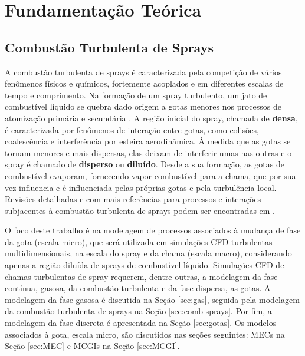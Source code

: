 

\section{Fundamentação Teórica}


\subsection{Combustão Turbulenta de Sprays} \label{sec:teoria}

A combustão turbulenta de sprays é caracterizada pela competição de vários fenômenos físicos e químicos, fortemente acoplados e em diferentes escalas de tempo e comprimento. 
Na formação de um spray turbulento, um jato de combustível líquido se quebra dado origem a gotas menores nos processos de atomização primária e secundária \cite{JennyB2012}.
A região inicial do spray, chamada de \textbf{densa}, é caracterizada por fenômenos de interação entre gotas, como colisões, coalescência e interferência por esteira aerodinâmica.
À medida que as gotas se tornam menores e mais dispersas, elas deixam de interferir umas nas outras e o spray é chamado de \textbf{disperso} ou \textbf{diluído}. 
Desde a sua formação, as gotas de combustível evaporam, fornecendo vapor combustível para a chama, que por sua vez influencia e é influenciada pelas próprias gotas e pela turbulência local.
Revisões detalhadas e com mais referências para processos e interações subjacentes à combustão turbulenta de sprays podem ser encontradas em \cite{JennyB2012, MasriA2016, SanchezA2015, ZhouL2021,JiangX2010}.

O foco deste trabalho é na modelagem de processos associados à mudança de fase da gota (escala micro), que será utilizada em simulações CFD turbulentas multidimensionais, na escala do spray e da chama (escala macro), considerando apenas a região diluída de sprays de combustível líquido.
Simulações CFD  de chamas turbulentas de spray requerem, dentre outras, a modelagem da fase contínua, gasosa, da combustão turbulenta e da fase dispersa, as gotas.
A modelagem da fase gasosa é discutida na Seção \ref{sec:gas}, seguida pela modelagem da combustão turbulenta de sprays na Seção \ref{sec:comb-sprays}. 
Por fim, a modelagem da fase discreta é apresentada na Seção \ref{sec:gotas}.
Os modelos associados à gota, escala micro, são discutidos nas seções seguintes: MECs na Seção	\ref{sec:MEC} e MCGIs na Seção \ref{sec:MCGI}.


